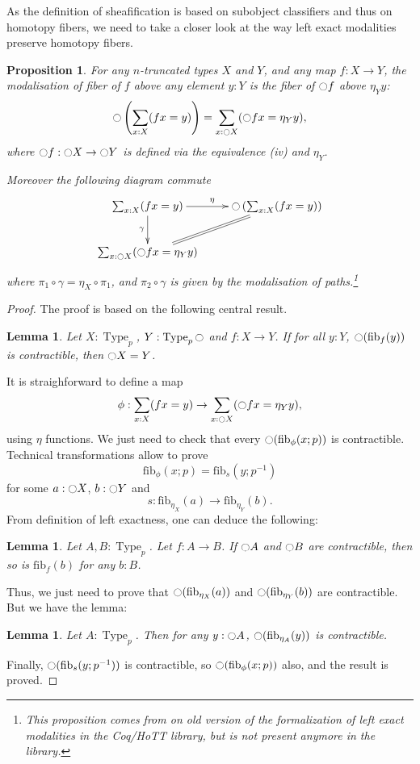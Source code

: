 \documentclass[conference]{IEEEtran}
\newtheorem{prop}[thm]{Proposition}
\newtheorem{lem}[thm]{Lemma}
\newcommand{\mynote}[2]{
    \fbox{\bfseries\sffamily\scriptsize#1}
    {\small$\blacktriangleright$\textsf{\emph{#2}}$\blacktriangleleft$}~}
\newcommand\kq[1]{\mynote{KQ}{#1}}
\newcommand\nt[1]{\mynote{NT}{#1}}
\DeclareMathOperator{\Type}{Type}
\newcommand{\modal}{\ensuremath{\ocircle}}
\newcommand \fib[2] {\mathrm{fib}_{#1}(#2)}
\begin{document}
As the definition of sheafification is based on subobject classifiers
and thus on homotopy fibers, we need to take a closer look at the way left
exact modalities preserve homotopy fibers.
%
\begin{prop}
\label{sec:defin-basic-prop}
For any $n$-truncated types $X$ and $Y$,
and any map $f:X \to Y$, the modalisation of fiber of $f$ above any element $y:Y$
is the fiber of $\modal f$ above $\eta_Y y$:
$$\modal \left(\sum_{x:X}  (f x = y)\right) = \sum_{x:\modal X}
(\modal f x = \eta_Y y),$$
where $\modal f:\modal X \to \modal Y$ is defined via the equivalence {\it (iv)} and $\eta_Y$.

Moreover the following diagram commute
$$\xymatrix{
  \sum_{x:X} (f x = y) \ar[r]^\eta \ar[d]_\gamma & \modal \left(\sum_{x:X}  (f x = y)\right) \ar@{=}[dl]\\
  \sum_{x:\modal X} (\modal f x = \eta_Y y) & }$$
where $\pi_1 \circ \gamma = \eta_X \circ \pi_1$, and
$\pi_2 \circ \gamma$ is given by the modalisation of
paths.\footnote{This proposition comes from on old version of the
  formalization of left exact modalities in the Coq/HoTT library, but is
  not present anymore in the library.}
\end{prop}
\begin{proof}

The proof is based on the following central result.
\begin{lem}
  Let $X:\Type_p$, $Y:\Type_p\modal$ and $f:X\to Y$. If for all $y:Y$,
  $\modal (\fib f y)$ is contractible, then $\modal X = Y$.
\end{lem}
%
It is straighforward to define a map
$$\phi:\sum_{x:X}  (f x = y)\to
\sum_{x:\modal X} (\modal f x = \eta_Y y),$$
using $\eta$ functions.
We just need to check that every $\modal(\fib \phi {x;p})$ is
contractible.
Technical transformations allow to prove
$$\fib\phi{x;p} = \fib s {y;p^{-1}}$$
for some $a:\modal X$, $b:\modal Y$ and 
$$s:\fib{\eta_X}a \to \fib{\eta_Y}b.$$
%
From definition of left exactness, one can deduce the following:
\begin{lem}
  Let $A,B:\Type_p$. Let $f:A\to B$. If $\modal A$ and $\modal B$ are
  contractible, then so is $\fib f b$ for any $b:B$.
\end{lem}
Thus, we just need to prove that $\modal(\fib {\eta_X} a)$ and
$\modal(\fib {\eta_Y} b)$ are contractible.
But we have the lemma:
\begin{lem}
  Let $A:\Type_p$. Then for any $y:\modal A$, $\modal(\fib {\eta_A}
  y)$ is contractible.
\end{lem}

Finally, $\modal(\fib s{y;p^{-1}})$ is contractible, so $\modal(\fib \phi {x;p})$ also, and the result is proved.

\end{proof}
\end{document}
